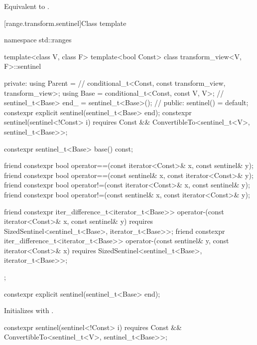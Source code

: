 \begin{itemdescr}
\pnum
\effects Equivalent to .
\end{itemdescr}


[range.transform.sentinel]{Class template }

\begin{codeblock}
namespace std::ranges {
  template<class V, class F>
  template<bool Const>
  class transform_view<V, F>::sentinel {
  private:
    using Parent =                                      // \expos
      conditional_t<Const, const transform_view, transform_view>;
    using Base = conditional_t<Const, const V, V>;      // \expos
    sentinel_t<Base> end_ = sentinel_t<Base>();         // \expos
  public:
    sentinel() = default;
    constexpr explicit sentinel(sentinel_t<Base> end);
    constexpr sentinel(sentinel<!Const> i)
      requires Const && ConvertibleTo<sentinel_t<V>, sentinel_t<Base>>;

    constexpr sentinel_t<Base> base() const;

    friend constexpr bool operator==(const iterator<Const>& x, const sentinel& y);
    friend constexpr bool operator==(const sentinel& x, const iterator<Const>& y);
    friend constexpr bool operator!=(const iterator<Const>& x, const sentinel& y);
    friend constexpr bool operator!=(const sentinel& x, const iterator<Const>& y);

    friend constexpr iter_difference_t<iterator_t<Base>>
      operator-(const iterator<Const>& x, const sentinel& y)
        requires SizedSentinel<sentinel_t<Base>, iterator_t<Base>>;
    friend constexpr iter_difference_t<iterator_t<Base>>
      operator-(const sentinel& y, const iterator<Const>& x)
        requires SizedSentinel<sentinel_t<Base>, iterator_t<Base>>;
  };
}
\end{codeblock}

\begin{itemdecl}
constexpr explicit sentinel(sentinel_t<Base> end);
\end{itemdecl}

\begin{itemdescr}
\pnum
\effects Initializes  with .
\end{itemdescr}

\begin{itemdecl}
constexpr sentinel(sentinel<!Const> i)
  requires Const && ConvertibleTo<sentinel_t<V>, sentinel_t<Base>>;
\end{itemdecl}

